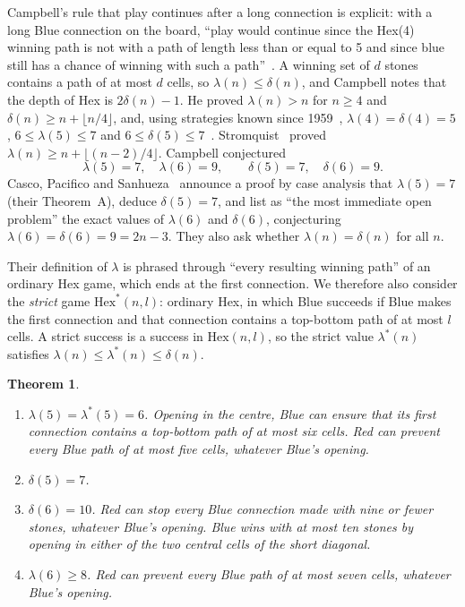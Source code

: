 \documentclass[11pt]{amsart}
\newtheorem{theorem}{Theorem}[section]
\theoremstyle{definition}
\theoremstyle{remark}
\newcommand{\Hex}{\mathrm{Hex}}
\begin{document}
Campbell's rule that play continues after a long connection is explicit: with a long Blue connection on the board, ``play would continue since the Hex(4) winning path is not with a path of length less than or equal to 5 and since blue still has a chance of winning with such a path''~\cite[\S2]{Campbell2004}. A winning set of $d$ stones contains a path of at most $d$ cells, so $\lambda(n)\le\delta(n)$, and Campbell notes that the depth of Hex is $2\delta(n)-1$. He proved $\lambda(n)>n$ for $n\ge4$ and $\delta(n)\ge n+\lfloor n/4\rfloor$, and, using strategies known since 1959~\cite{Gardner1959}, $\lambda(4)=\delta(4)=5$, $6\le\lambda(5)\le7$ and $6\le\delta(5)\le7$~\cite[Corollaries 12, 13, Theorems 14, 15]{Campbell2004}. Stromquist~\cite{Stromquist2007} proved $\lambda(n)\ge n+\lfloor (n-2)/4\rfloor$. Campbell conjectured~\cite[Conjectures 19, 20]{Campbell2004}
\[
\lambda(5)=7,\quad \lambda(6)=9,\qquad \delta(5)=7,\quad \delta(6)=9.
\]
Casco, Pacifico and Sanhueza~\cite{CPS2026} announce a proof by case analysis that $\lambda(5)=7$ (their Theorem~A), deduce $\delta(5)=7$, and list as ``the most immediate open problem'' the exact values of $\lambda(6)$ and $\delta(6)$, conjecturing $\lambda(6)=\delta(6)=9=2n-3$. They also ask whether $\lambda(n)=\delta(n)$ for all $n$.

Their definition of $\lambda$ is phrased through ``every resulting winning path'' of an ordinary Hex game, which ends at the first connection. We therefore also consider the \emph{strict} game $\Hex^{*}(n,l)$: ordinary Hex, in which Blue succeeds if Blue makes the first connection and that connection contains a top-bottom path of at most $l$ cells. A strict success is a success in $\Hex(n,l)$, so the strict value $\lambda^{*}(n)$ satisfies $\lambda(n)\le\lambda^{*}(n)\le\delta(n)$.

\begin{theorem}\label{thm:main}
\begin{enumerate}
\item $\lambda(5)=\lambda^{*}(5)=6$. Opening in the centre, Blue can ensure that its first connection contains a top-bottom path of at most six cells. Red can prevent every Blue path of at most five cells, whatever Blue's opening.
\item $\delta(5)=7$.
\item $\delta(6)=10$. Red can stop every Blue connection made with nine or fewer stones, whatever Blue's opening. Blue wins with at most ten stones by opening in either of the two central cells of the short diagonal.
\item $\lambda(6)\ge8$. Red can prevent every Blue path of at most seven cells, whatever Blue's opening.
\end{enumerate}
\end{theorem}
\end{document}
